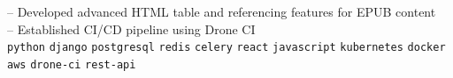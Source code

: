 \begin{entrylist}
{        -- Developed advanced HTML table and referencing features for EPUB content \\
        -- Established CI/CD pipeline using Drone CI\\
        \texttt{python}\slashsep
        \texttt{django}\slashsep
        \texttt{postgresql}\slashsep
        \texttt{redis}\slashsep
        \texttt{celery}\slashsep
        \texttt{react}\slashsep
        \texttt{javascript}\slashsep
        \texttt{kubernetes}\slashsep
        \texttt{docker}\slashsep
        \texttt{aws}\slashsep
        \texttt{drone-ci}\slashsep
        \texttt{rest-api}\slashsep
    }
\end{entrylist}



